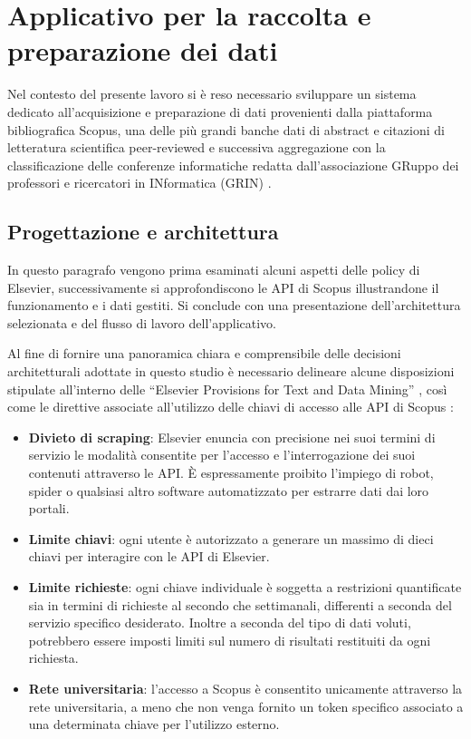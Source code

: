 \chapter{Applicativo per la raccolta e preparazione dei dati}\label{scopusBulkDownloader}

Nel contesto del presente lavoro si è reso necessario sviluppare un sistema dedicato all'acquisizione e preparazione di dati provenienti dalla piattaforma bibliografica Scopus, una delle più grandi banche dati di abstract e citazioni di letteratura scientifica peer-reviewed \cite{scopus-website} e successiva aggregazione con la classificazione delle conferenze informatiche \cite{conference-rating-website} redatta dall'associazione GRuppo dei professori e ricercatori in INformatica (GRIN) \cite{GRIN-website}.

\section{Progettazione e architettura}
In questo paragrafo vengono prima esaminati alcuni aspetti delle policy di Elsevier, successivamente si approfondiscono le API di Scopus illustrandone il funzionamento e i dati gestiti. Si conclude con una presentazione dell'architettura selezionata e del flusso di lavoro dell'applicativo.
\newline

Al fine di fornire una panoramica chiara e comprensibile delle decisioni architetturali adottate in questo studio è necessario delineare alcune disposizioni stipulate all'interno delle ``Elsevier Provisions for Text and Data Mining'' \cite{scopus-policy}, così come le direttive associate all'utilizzo delle chiavi di accesso alle API di Scopus \cite{scopus-key-settings}:
\begin{itemize}
    \item \textbf{Divieto di scraping}: Elsevier enuncia con precisione nei suoi termini di servizio le modalità consentite per l'accesso e l'interrogazione dei suoi contenuti attraverso le API. È espressamente proibito l'impiego di robot, spider o qualsiasi altro software automatizzato per estrarre dati dai loro portali.

    \item \textbf{Limite chiavi}: ogni utente è autorizzato a generare un massimo di dieci chiavi per interagire con le API di Elsevier.

    \item \textbf{Limite richieste}: ogni chiave individuale è soggetta a restrizioni quantificate sia in termini di richieste al secondo che settimanali, differenti a seconda del servizio specifico desiderato. Inoltre a seconda del tipo di dati voluti, potrebbero essere imposti limiti sul numero di risultati restituiti da ogni richiesta.

    \item \textbf{Rete universitaria}: l'accesso a Scopus è consentito unicamente attraverso la rete universitaria, a meno che non venga fornito un token specifico associato a una determinata chiave per l'utilizzo esterno.
\end{itemize}

